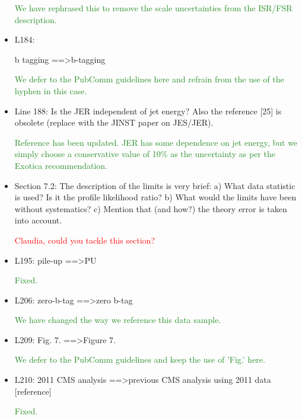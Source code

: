 \documentclass[paper=a4, fontsize=11pt]{scrartcl}
\begin{document}
\begin{itemize}
\textcolor{ForestGreen}{We have rephrased this to remove the scale uncertainties from the ISR/FSR description.}\\


\item L184: 

b tagging ==\textgreater b-tagging 

\textcolor{ForestGreen}{We defer to the PubComm guidelines here and refrain from the use of the hyphen
in this case.}\\


\item Line 188: 
Is the JER independent of jet energy? Also the reference [25] is obsolete 
(replace with the JINST paper on JES/JER). 

\textcolor{ForestGreen}{Reference has been updated. JER has some dependence on jet energy,
but we simply choose a conservative value of 10\% as the uncertainty as per the Exotica
recommendation.}\\

\item Section 7.2: 
The description of the limits is very brief: 
a) What data statistic is used? Is it the profile likelihood ratio? 
b) What would the limits have been without systematics? 
c) Mention that (and how?) the theory error is taken into account. 

\textcolor{Red}{Claudia, could you tackle this section?}\\

\item L195: 
pile-up ==\textgreater PU 

\textcolor{ForestGreen}{Fixed.}\\

\item L206: 
zero-b-tag ==\textgreater zero b-tag 

\textcolor{ForestGreen}{We have changed the way we reference this data sample.}\\


\item L209: 
Fig. 7. ==\textgreater Figure 7. 

\textcolor{ForestGreen}{We defer to the PubComm guidelines and keep the use of 'Fig.' here.}\\


\item L210: 
2011 CMS analysis ==\textgreater previous CMS analysis using 2011 data [reference] 

\textcolor{ForestGreen}{Fixed.}\\



\end{itemize}
\end{document}
